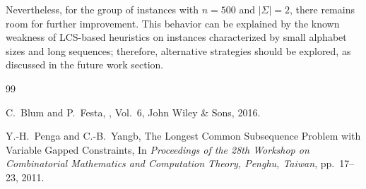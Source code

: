 \documentclass[runningheads]{llncs}
\begin{document}
Nevertheless, for the group of instances with $n=500$ and $|\Sigma|=2$, there remains room for further improvement. This behavior can be explained by the known weakness of LCS-based heuristics on instances characterized by small alphabet sizes and long sequences; therefore, alternative strategies should be explored, as discussed in the future work section.
\begin{thebibliography}{99}
	
	C.~Blum and P.~Festa,
	,
	\newblock Vol.~6, John Wiley \& Sons, 2016.
	
	Y.-H.~Penga and C.-B.~Yangb,
	\newblock The Longest Common Subsequence Problem with Variable Gapped Constraints,
	\newblock In {\em Proceedings of the 28th Workshop on Combinatorial Mathematics and Computation Theory, Penghu, Taiwan}, pp.~17--23, 2011.
	
\end{thebibliography}
\end{document}
